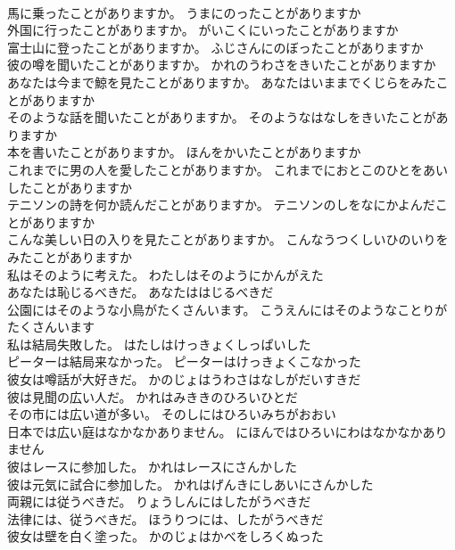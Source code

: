 \documentclass[8pt]{extreport}
\begin{document}
\begin{CJK}{UTF8}{min}
\\	馬に乗ったことがありますか。	うまにのったことがありますか 
\\	外国に行ったことがありますか。	がいこくにいったことがありますか 
\\	富士山に登ったことがありますか。	ふじさんにのぼったことがありますか 
\\	彼の噂を聞いたことがありますか。	かれのうわさをきいたことがありますか 
\\	あなたは今まで鯨を見たことがありますか。	あなたはいままでくじらをみたことがありますか 
\\	そのような話を聞いたことがありますか。	そのようなはなしをきいたことがありますか 
\\	本を書いたことがありますか。	ほんをかいたことがありますか 
\\	これまでに男の人を愛したことがありますか。	これまでにおとこのひとをあいしたことがありますか 
\\	テニソンの詩を何か読んだことがありますか。	テニソンのしをなにかよんだことがありますか 
\\	こんな美しい日の入りを見たことがありますか。	こんなうつくしいひのいりをみたことがありますか 
\\	私はそのように考えた。	わたしはそのようにかんがえた 
\\	あなたは恥じるべきだ。	あなたははじるべきだ 
\\	公園にはそのような小鳥がたくさんいます。	こうえんにはそのようなことりがたくさんいます 
\\	私は結局失敗した。	はたしはけっきょくしっぱいした 
\\	ピーターは結局来なかった。	ピーターはけっきょくこなかった 
\\	彼女は噂話が大好きだ。	かのじょはうわさはなしがだいすきだ 
\\	彼は見聞の広い人だ。	かれはみききのひろいひとだ 
\\	その市には広い道が多い。	そのしにはひろいみちがおおい 
\\	日本では広い庭はなかなかありません。	にほんではひろいにわはなかなかありません 
\\	彼はレースに参加した。	かれはレースにさんかした 
\\	彼は元気に試合に参加した。	かれはげんきにしあいにさんかした 
\\	両親には従うべきだ。	りょうしんにはしたがうべきだ 
\\	法律には、従うべきだ。	ほうりつには、したがうべきだ 
\\	彼女は壁を白く塗った。	かのじょはかべをしろくぬった 

\end{CJK}
\end{document}
